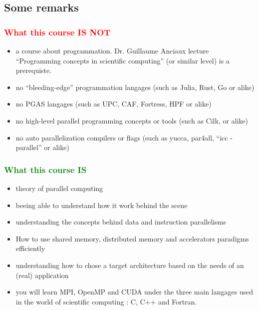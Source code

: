 \subsection{Some remarks}

\begin{frame}[containsverbatim]
\frametitle{\textcolor{red}{What this course IS NOT}}

\begin{itemize}
\color{red}

	\item a course about programmation. Dr. Guillaume Anciaux lecture ``Programming concepts in scientific computing'' (or similar level) is a prerequiste.

	\item no ``bleeding-edge'' programmation langages (such as Julia, Rust, Go or alike)

	\item no PGAS langages (such as UPC, CAF, Fortress, HPF or alike)

	\item no high-level parallel programming concepts or tools (such as Cilk, or alike)

	\item no auto parallelization compilers or flags (such as yucca, par4all, ``icc -parallel'' or alike)

\end{itemize}
\end{frame}


\begin{frame}[containsverbatim]
\frametitle{\textcolor{green}{What this course IS}}

\begin{itemize}
\color{green}
	\item theory of parallel computing

	\item beeing able to understand how it work behind the scene

	\item understanding the concepts behind data and instruction parallelisms

	\item How to use shared memory, distributed memory and accelerators paradigms efficiently

	\item understanding how to chose a target architecture based on the needs of an (real) application

	\item you will learn MPI, OpenMP and CUDA under the three main langages used in the world of scientific computing : C, C++ and Fortran.

\end{itemize}

\end{frame}

